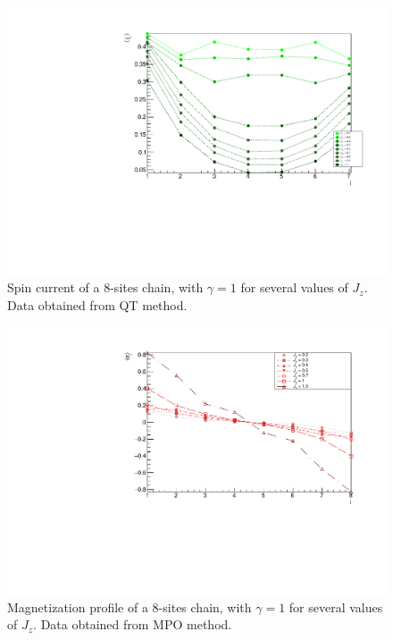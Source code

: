 \begin{figure}[H]
    \centering
    \includegraphics[scale=0.7]{Figures/8sites/8sites_spinCurrVSJzQT.pdf}
    \caption{Spin current of a 8-sites chain, with $\gamma = 1$ for several values of $J_z$. Data obtained from QT method.}
    \label{fig:8sites_spinCurrVSJzQT}
\end{figure}


\begin{figure}[H]
    \centering
    \includegraphics[scale=0.7]{Figures/8sites_LMvsJz.pdf}
    \caption{Magnetization profile of a 8-sites chain, with $\gamma = 1$ for several values of $J_z$. Data obtained from MPO method.}
    \label{fig:8sites_LMvsJz}
\end{figure}

